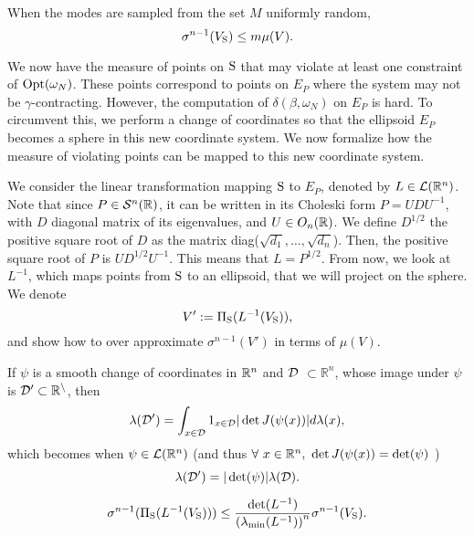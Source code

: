 \begin{corollary} \label{cor:measure}When the modes are sampled from the set $M$ uniformly random, 
\begin{equation*}\sigma^{n-1}(V_{\text{S}}) \leq m \mu(V). \end{equation*}
\end{corollary}

We now have the measure of points on $\text{S}$ that may violate at least one constraint of $\text{Opt}(\omega_N)$. These points correspond to points on $E_P$ where the system may not be $\gamma$-contracting. However, the computation of $\delta(\beta, \omega_N)$ on $E_P$ is hard. To circumvent this, we perform a change of coordinates so that the ellipsoid $E_P$ becomes a sphere in this new coordinate system. We now formalize how the measure of violating points can be mapped to this new coordinate system.

We consider the linear transformation mapping $\text{S}$ to $E_P$, denoted by $L \in \mathcal{L}(\mathbb{R}^n)$. Note that since $P \in \mathcal{S}^n(\mathbb{R})$, it can be written in its Choleski form $P = U D U^{-1}$, with $D$ diagonal matrix of its eigenvalues, and $U \in O_n(\mathbb{R})$. We define $D^{1/2}$ the positive square root of $D$ as the matrix diag($\sqrt{d_1},\dots, \sqrt{d_n}$). Then, the positive square root of $P$ is $U D^{1/2} U^{-1}$. This means that $L = P^{1/2}$. 
From now, we look at $L^{-1}$, which maps points from $\text{S}$ to an ellipsoid, that we will project on the sphere. We denote $$V':=\Pi_{\text{S}}(L^{-1}(V_{\text{S}})),$$ and show how to over approximate $\sigma^{n-1}(V')$ in terms of $\mu(V)$.

\begin{remark} \label{rem:mappingMeasures}
If $\psi$ is a smooth change of coordinates in $\mathbb{R}^n$ and $\cal{D}$ $\subset \mathbb{R}^n$, whose image under $\psi$ is $\cal{D}' \subset \R^n$, then
\begin{equation}
\lambda(\mathcal{D}') = \int_{x \in \mathcal{D}} 1_{x \in \mathcal{D}} |\det J(\psi(x))| d\lambda(x),
\end{equation}
which becomes when $\psi \in \mathcal{L}(\mathbb{R}^n)$ (and thus $\forall\ x \in \mathbb{R}^n, \ \det J(\psi(x)) = \det(\psi)$ )
\begin{equation}
\lambda(\mathcal{D}') = |\det(\psi)| \lambda(\mathcal{D}).
\end{equation}
\end{remark}

\begin{theorem} \label{lemma:lip}
\begin{equation}
\sigma^{n-1}(\Pi_{\text{S}}(L^{-1}(V_{\text{S}}))) \leq \frac{\det(L^{-1})}{\left(\lambda_{\min}(L^{-1})\right)^n} \sigma^{n-1}(V_{\text{S}}).
\end{equation}   
\end{theorem}

